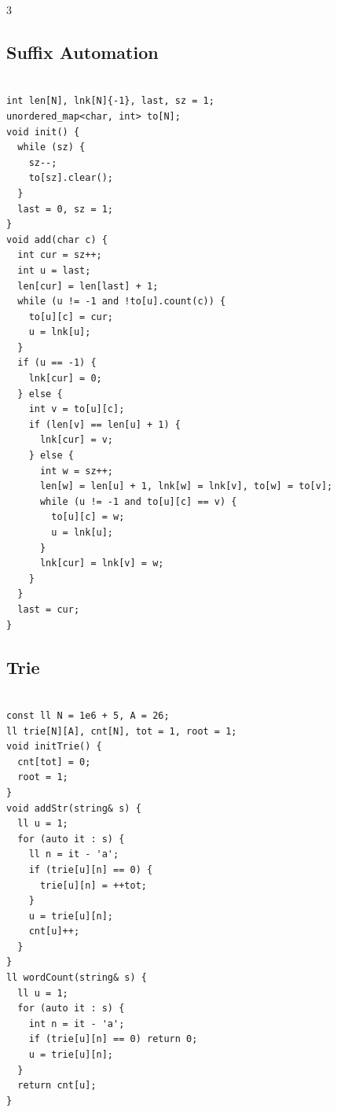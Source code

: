 \documentclass[10pt, landscape, a4paper, onesided]{extarticle}
\begin{document}
\begin{multicols*}{3}
\subsection{Suffix Automation}
\begin{verbatim}

int len[N], lnk[N]{-1}, last, sz = 1;
unordered_map<char, int> to[N];
void init() {
  while (sz) {
    sz--;
    to[sz].clear();
  }
  last = 0, sz = 1;
}
void add(char c) {
  int cur = sz++;
  int u = last;
  len[cur] = len[last] + 1;
  while (u != -1 and !to[u].count(c)) {
    to[u][c] = cur;
    u = lnk[u];
  }
  if (u == -1) {
    lnk[cur] = 0;
  } else {
    int v = to[u][c];
    if (len[v] == len[u] + 1) {
      lnk[cur] = v;
    } else {
      int w = sz++;
      len[w] = len[u] + 1, lnk[w] = lnk[v], to[w] = to[v];
      while (u != -1 and to[u][c] == v) {
        to[u][c] = w;
        u = lnk[u];
      }
      lnk[cur] = lnk[v] = w;
    }
  }
  last = cur;
}
\end{verbatim}

\subsection{Trie}
\begin{verbatim}

const ll N = 1e6 + 5, A = 26;
ll trie[N][A], cnt[N], tot = 1, root = 1;
void initTrie() {
  cnt[tot] = 0;
  root = 1;
}
void addStr(string& s) {
  ll u = 1;
  for (auto it : s) {
    ll n = it - 'a';
    if (trie[u][n] == 0) {
      trie[u][n] = ++tot;
    }
    u = trie[u][n];
    cnt[u]++;
  }
}
ll wordCount(string& s) {
  ll u = 1;
  for (auto it : s) {
    int n = it - 'a';
    if (trie[u][n] == 0) return 0;
    u = trie[u][n];
  }
  return cnt[u];
}
\end{verbatim}


\end{multicols*}
\end{document}
